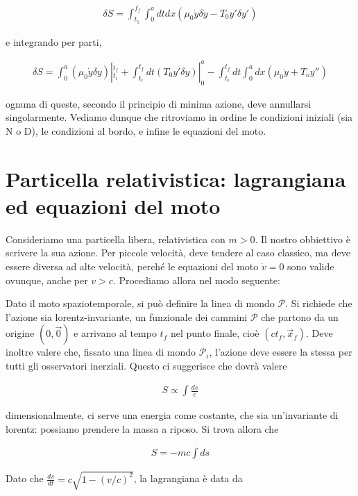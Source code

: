 \documentclass{report}
\begin{document}
\begin{align}
    \delta S = \int_{t_1}^{f_f}\int_0^a dt dx (\mu_0\dot{y}\delta \dot{y} - T_0 y' \delta y')
\end{align}

e integrando per parti, 

\begin{align}
    \delta S = \int_0^a (\mu_0\dot{y}\delta y)|^{t_f}_{t_i} + \int_{t_i}^{t_f}dt (T_0 y' \delta y)|^a_0 - \int_{t_i}^{t_f}dt \int_0^a dx (\mu_0 \ddot{y} + T_o y'')
\end{align}

ognuna di queste, secondo il principio di minima azione, deve annullarsi singolarmente. Vediamo dunque che ritroviamo in ordine le condizioni iniziali (sia N o D), le condizioni al bordo, e infine le equazioni del moto. 

\section{Particella relativistica: lagrangiana ed equazioni del moto}


Consideriamo una particella libera, relativistica con \(m>0\). Il nostro obbiettivo è scrivere la sua azione. Per piccole velocità, deve tendere al caso classico, ma deve essere diversa ad alte velocità, perché le equazioni del moto \(\dot{v} = 0\) sono valide ovunque, anche per \(v > c\). Procediamo allora nel modo seguente: 

Dato il moto spaziotemporale, si può definire la linea di mondo \(\mathcal{P}\). Si richiede che l'azione sia lorentz-invariante, un funzionale dei cammini \(\mathcal{P}\) che partono da un origine \((0,\vec{0})\) e arrivano al tempo \(t_f\) nel punto finale, cioè \((ct_f, \vec{x}_f)\). Deve inoltre valere che, fissato una linea di mondo \(\mathcal{P}_i\), l'azione deve essere la stessa per tutti gli osservatori inerziali. Questo ci suggerisce che dovrà valere 

\begin{align}
    S \propto \int \frac{ds}{c}
\end{align}


dimensionalmente, ci serve una energia come costante, che sia un'invariante di lorentz: possiamo prendere la massa a riposo. Si trova allora che 

\begin{align}
    S = -mc\int ds
\end{align}

Dato che \(\frac{ds}{dt} = c\sqrt{1-(v/c)^2}\), la lagrangiana è data da 
\end{document}
